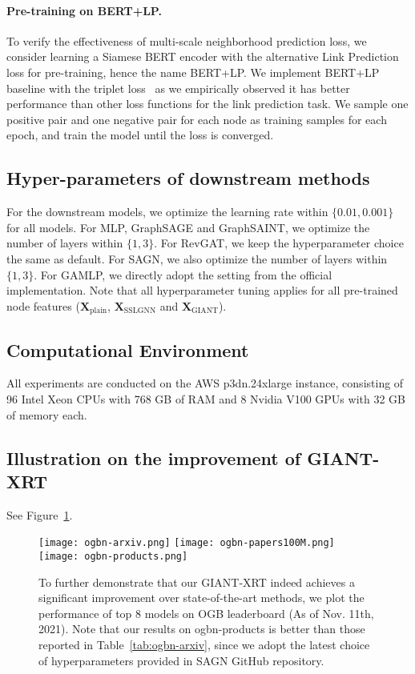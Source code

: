 \documentclass{article} \usepackage{iclr2022_conference,times}
\begin{document}
\paragraph{Pre-training on BERT+LP.}
To verify the effectiveness of multi-scale neighborhood prediction loss, we consider learning a Siamese BERT encoder with the alternative Link Prediction loss for pre-training, hence the name BERT+LP.
We implement BERT+LP baseline with the triplet loss~\citep{balntas2016learning} as we empirically observed it has better performance than other loss functions for the link prediction task. 
We sample one positive pair and one negative pair for each node as training samples for each epoch, and train the model until the loss is converged.


\subsection{Hyper-parameters of downstream methods}
For the downstream models, we optimize the learning rate within $\{0.01,0.001\}$ for all models. For MLP, GraphSAGE and GraphSAINT, we optimize the number of layers within $\{1,3\}$. For RevGAT, we keep the hyperparameter choice the same as default. For SAGN, we also optimize the number of layers within $\{1,3\}$. For GAMLP, we directly adopt the setting from the official implementation. Note that all hyperparameter tuning applies for all pre-trained node features ($\mathbf{X}_{\text{plain}}$, $\mathbf{X}_{\text{SSLGNN}}$ and $\mathbf{X}_{\text{GIANT}}$). 

\subsection{Computational Environment}
All experiments are conducted on the AWS p3dn.24xlarge instance, consisting of
96 Intel Xeon CPUs with 768 GB of RAM and 8 Nvidia V100 GPUs with 32 GB of memory each.

\subsection{Illustration on the improvement of GIANT-XRT}\label{app:improvement}
See Figure~\ref{fig:improvement}.
\begin{figure}[h]
\centering
  \texttt{[image: ogbn-arxiv.png]}
  \texttt{[image: ogbn-papers100M.png]}
  \texttt{[image: ogbn-products.png]}
\caption{To further demonstrate that our GIANT-XRT indeed achieves a significant improvement over state-of-the-art methods, we plot the performance of top 8 models on OGB leaderboard (As of Nov. 11th, 2021). Note that our results on ogbn-products is better than those reported in Table~\ref{tab:ogbn-arxiv}, since we adopt the latest choice of hyperparameters provided in SAGN GitHub repository.}\label{fig:improvement}
\vspace{-0.1in}
\end{figure}
\end{document}
